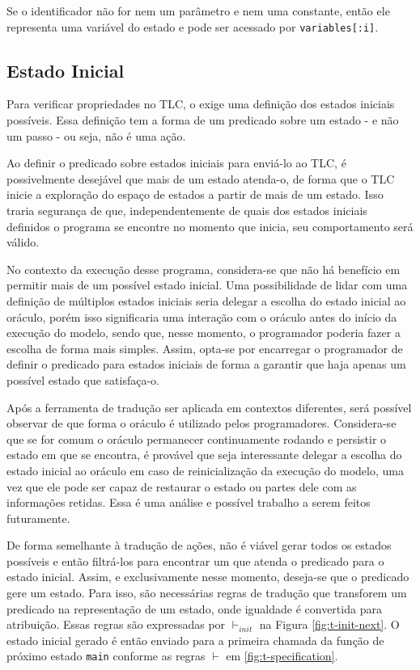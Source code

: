 Se o identificador não for nem um parâmetro e nem uma constante, então ele
representa uma variável do estado e pode ser acessado por \texttt{variables[:i]}.

\subsection{Estado Inicial}

Para verificar propriedades no TLC, o \TLA exige uma definição dos estados
iniciais possíveis. Essa definição tem a forma de um predicado sobre um estado
- e não um passo - ou seja, não é uma ação.

Ao definir o predicado sobre estados iniciais para enviá-lo ao TLC, é
possivelmente desejável que mais de um estado atenda-o, de forma que o TLC
inicie a exploração do espaço de estados a partir de mais de um estado. Isso
traria segurança de que, independentemente de quais dos estados iniciais definidos o
programa se encontre no momento que inicia, seu comportamento será válido.

No contexto da execução desse programa, considera-se que não há benefício em
permitir mais de um possível estado inicial. Uma possibilidade de lidar com uma
definição de múltiplos estados iniciais seria delegar a escolha do estado
inicial ao oráculo, porém isso significaria uma interação com o oráculo antes do
início da execução do modelo, sendo que, nesse momento, o programador poderia
fazer a escolha de forma mais simples. Assim, opta-se por encarregar o
programador de definir o predicado para estados iniciais de forma a garantir que
haja apenas um possível estado que satisfaça-o.

Após a ferramenta de tradução ser aplicada em contextos diferentes, será
possível observar de que forma o oráculo é utilizado pelos programadores.
Considera-se que se for comum o oráculo permanecer continuamente rodando e
persistir o estado em que se encontra, é provável que seja interessante delegar a
escolha do estado inicial ao oráculo em caso de reinicialização da execução do
modelo, uma vez que ele pode ser capaz de restaurar o estado ou partes dele com
as informações retidas. Essa é uma análise e possível trabalho a serem feitos
futuramente.

De forma semelhante à tradução de ações, não é viável gerar todos os estados
possíveis e então filtrá-los para encontrar um que atenda o predicado para o
estado inicial. Assim, e exclusivamente nesse momento, deseja-se que o predicado
gere um estado. Para isso, são necessárias regras de tradução que transforem um
predicado na representação de um estado, onde igualdade é convertida para
atribuição. Essas regras são expressadas por $\vdash_{init}$ na Figura
\ref{fig:t-init-next}. O estado inicial gerado é então enviado para a primeira
chamada da função de próximo estado \texttt{main} conforme as regras $\vdash$ em \ref{fig:t-specification}.

